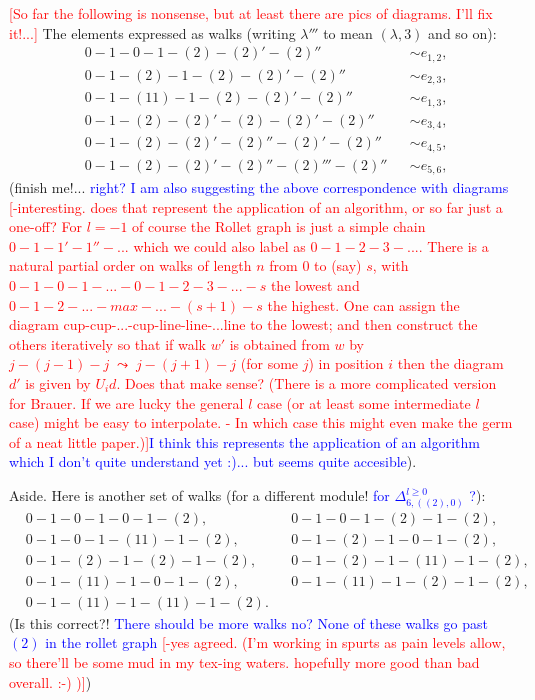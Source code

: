 \documentclass{article}
\newcommand{\ppm}[1]{\textcolor{red}{#1}}
\newcommand{\bajm}[1]{\textcolor{blue}{#1}}
\theoremstyle{definition}
\numberwithin{equation}{subsection}
\begin{document}
{{\ppm{[So far the following is nonsense, but at least there are pics of diagrams. I'll fix it!...]}
The elements expressed as walks (writing $\lambda'''$ to mean $(\lambda,3)$ and so on):
\begin{align*}
    &0-1-0-1-(2)-(2)'-(2)''& &\sim e_{1,2}, \\
&0-1-(2)-1-(2)-(2)'-(2)'' &&\sim e_{2,3}, \\
&0-1-(11)-1-(2)-(2)'-(2)'' &&\sim e_{1,3}, \\
&0-1-(2)-(2)'-(2)-(2)'-(2)''&&\sim e_{3,4}, \\
&0-1-(2)-(2)'-(2)''-(2)'-(2)''&&\sim e_{4,5}, \\
& 0-1-(2)-(2)'-(2)''-(2)'''-(2)'' &&\sim e_{5,6},\end{align*}
(finish me!... \bajm{right? I am also suggesting the above correspondence with diagrams} \ppm{[-interesting. does that represent the application of an algorithm, or so far just a one-off?
For $l=-1$ of course the Rollet graph is just a simple chain $0-1-1'-1''-...$ which we could also label as $0-1-2-3-...$. There is a natural partial order on walks of length $n$ from 0 to (say) $s$, with $0-1-0-1-...-0-1-2-3-...-s$ the lowest and $0-1-2-...-max-...-(s+1)-s$ the highest. One can assign the diagram cup-cup-...-cup-line-line-...line to the lowest; and then construct the others iteratively so that if walk $w'$ is obtained from $w$ by $j-(j-1)-j \;\leadsto\; j-(j+1)-j$ (for some $j$) in position $i$ then the diagram $d'$ is given by $U_i d$. Does that make sense? (There is a more complicated version for Brauer. If we are lucky the general $l$ case (or at least some intermediate $l$ case) might be easy to interpolate.  - In which case this might even make the germ of a neat little paper.)]}\bajm{I think this represents the application of an algorithm which I don't quite understand yet :)... but seems quite accesible}). 


Aside. Here is another set of walks (for a different module! \bajm{for $\Delta^{l\geq 0}_{6,((2),0)}$ ?}):
\begin{align*} 
&0-1-0-1-0-1-(2), &&
0-1-0-1-(2)-1-(2),\\
&0-1-0-1-(11)-1-(2),
&&0-1-(2)-1-0-1-(2),
\\ &0-1-(2)-1-(2)-1-(2),
&&0-1-(2)-1-(11)-1-(2),
\\ &0-1-(11)-1-0-1-(2),
&&0-1-(11)-1-(2)-1-(2),
\\&0-1-(11)-1-(11)-1-(2).\end{align*}
(Is this correct?! \bajm{There should be more walks no? None of these walks go past $(2)$ in the rollet graph} \ppm{[-yes agreed. (I'm working in spurts as pain levels allow, so there'll be some mud in my tex-ing waters. hopefully more good than bad overall.  :-) )]})



}}
\end{document}
